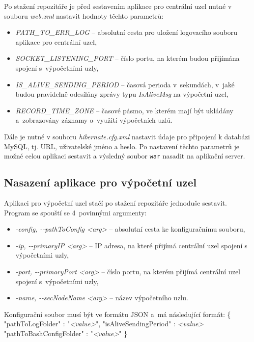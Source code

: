 Po stažení repozitáře je před sestavením aplikace pro centrální uzel nutné v souboru \textit{web.xml} nastavit hodnoty těchto parametrů:
\begin{itemize}
    \item \textit{PATH\_TO\_ERR\_LOG} -- absolutní cesta pro uložení logovacího souboru aplikace pro centrální uzel,
    \item \textit{SOCKET\_LISTENING\_PORT} -- číslo portu, na kterém budou přijímána spojení s~výpočetními uzly,
    \item \textit{IS\_ALIVE\_SENDING\_PERIOD} -- časová perioda v~sekundách, v~jaké budou pravidelně odesílány zprávy typu \textit{IsAliveMsg} na výpočetní uzel,
    \item \textit{RECORD\_TIME\_ZONE} -- časové pásmo, ve kterém mají být ukládány a~zobrazovány záznamy o~využití výpočetních uzlů.
\end{itemize}

Dále je nutné v souboru \textit{hibernate.cfg.xml} nastavit údaje pro připojení k databázi MySQL, tj. URL, uživatelské jméno a heslo. Po nastavení těchto parametrů je možné celou aplikaci sestavit a výsledný soubor \texttt{war} nasadit na aplikační server.

\subsection*{Nasazení aplikace pro výpočetní uzel}

Aplikaci pro výpočetní uzel stačí po stažení repozitáře jednoduše sestavit. Program se spouští se 4~povinnými argumenty:
\begin{itemize}
    \item \textit{-config, -{}-pathToConfig <arg>} -- absolutní cesta ke konfiguračnímu souboru,
    \item \textit{-ip, -{}-primaryIP <arg>} -- IP adresa, na které přijímá centrální uzel spojení s výpočetními uzly,
    \item \textit{-port, -{}-primaryPort <arg>} -- číslo portu, na kterém přijímá centrální uzel spojení s~výpočetními uzly,
    \item \textit{-name, -{}-secNodeName <arg>} --  název výpočetního uzlu.
\end{itemize}

Konfigurační soubor musí být ve formátu JSON a~má následující formát:
\vspace{0.6cm} \newline
\hspace*{1.5cm}\{  \newline
    \hspace*{2cm} "pathToLogFolder" : "\textit{<value>}", \newline
    \hspace*{2cm} "isAliveSendingPeriod" : \textit{<value>} \newline
    \hspace*{2cm} "pathToBashConfigFolder" : "\textit{<value>}"  \newline
\hspace*{1.5cm}\}
\vspace{0.6cm}

